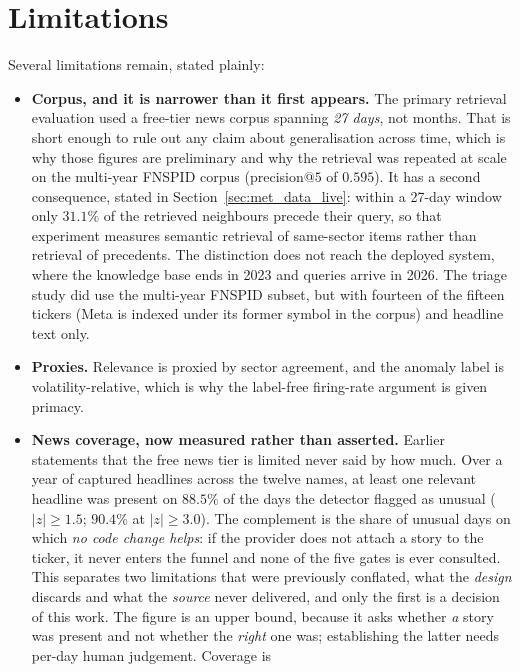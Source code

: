 \section{Limitations}
\label{sec:concl_limitations}

Several limitations remain, stated plainly:
\begin{itemize}
  \item \textbf{Corpus, and it is narrower than it first appears.} The primary retrieval evaluation
        used a free-tier news corpus spanning \emph{27 days}, not months. That is short enough to
        rule out any claim about generalisation across time, which is why those figures are
        preliminary and why the retrieval was repeated at scale on the multi-year FNSPID corpus
        (precision@$5$ of $0.595$). It has a second consequence, stated in
        Section~\ref{sec:met_data_live}: within a 27-day window only $31.1\%$ of the retrieved
        neighbours precede their query, so that experiment measures semantic retrieval of
        same-sector items rather than retrieval of precedents. The distinction does not reach the
        deployed system, where the knowledge base ends in 2023 and queries arrive in 2026. The
        triage study did use the multi-year FNSPID subset, but with fourteen of the
        fifteen tickers (Meta is indexed under its former symbol in the corpus) and headline text only.
  \item \textbf{Proxies.} Relevance is proxied by sector agreement, and the anomaly label is
        volatility-relative, which is why the label-free firing-rate argument is given primacy.
  \item \textbf{News coverage, now measured rather than asserted.} Earlier statements that the free
        news tier is limited never said by how much. Over a year of captured headlines across the
        twelve names, at least one relevant headline was present on $88.5\%$ of the days the detector
        flagged as unusual ($|z|\ge1.5$; $90.4\%$ at $|z|\ge3.0$). The complement is the share of
        unusual days on which \emph{no code change helps}: if the provider does not attach a story to
        the ticker, it never enters the funnel and none of the five gates is ever consulted. This
        separates two limitations that were previously conflated, what the \emph{design} discards and
        what the \emph{source} never delivered, and only the first is a decision of this work. The
        figure is an upper bound, because it asks whether \emph{a} story was present and not whether
        the \emph{right} one was; establishing the latter needs per-day human judgement. Coverage is

\end{itemize}
